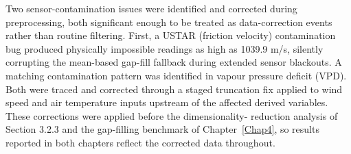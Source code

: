 Two sensor-contamination issues were identified and corrected during preprocessing, both
significant enough to be treated as data-correction events rather than routine filtering. First, a
USTAR (friction velocity) contamination bug produced physically impossible readings as high as
1039.9 m/s, silently corrupting the mean-based gap-fill fallback during extended sensor blackouts.
A matching contamination pattern was identified in vapour pressure deficit (VPD). Both were traced
and corrected through a staged truncation fix applied to wind speed and air temperature inputs
upstream of the affected derived variables. These corrections were applied before the dimensionality-
reduction analysis of Section 3.2.3 and the gap-filling benchmark of Chapter~\ref{Chap4}, so results
reported in both chapters reflect the corrected data throughout.
